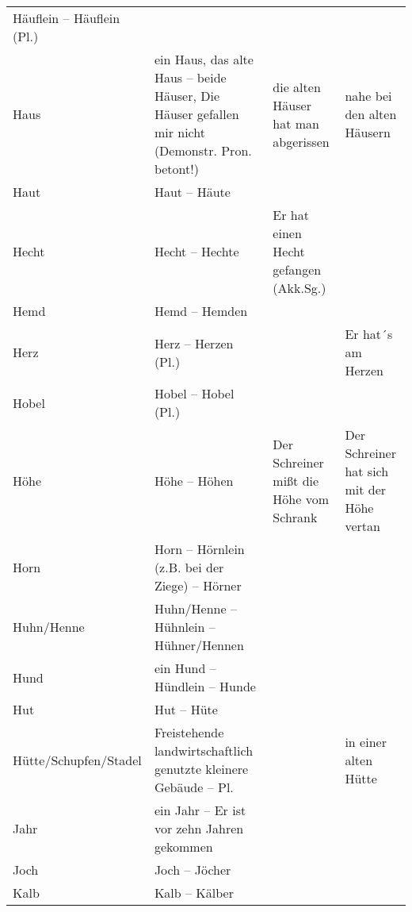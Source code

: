 {\begin{xltabular}{\textwidth}{>{\raggedright\arraybackslash}p{.15\textwidth}QQQ}
Häuflein -- Häuflein (Pl.) &  & \\
Haus & ein Haus, das alte Haus -- beide Häuser, Die Häuser gefallen mir nicht (Demonstr. Pron. betont!) & die alten Häuser hat man abgerissen & nahe bei den alten Häusern\\
Haut & Haut -- Häute &  & \\
Hecht & Hecht -- Hechte & Er hat einen Hecht gefangen (Akk.Sg.) & \\
Hemd & Hemd -- Hemden &  & \\
Herz & Herz -- Herzen (Pl.) &  & Er hat´s am Herzen\\
Hobel & Hobel -- Hobel (Pl.) &  & \\
Höhe & Höhe -- Höhen & Der Schreiner mißt die Höhe vom Schrank & Der Schreiner hat sich mit der Höhe vertan\\
Horn & Horn -- Hörnlein (z.B. bei der Ziege) -- Hörner &  & \\
Huhn\slash Henne & Huhn\slash Henne -- Hühnlein -- Hühner\slash Hennen &  & \\
Hund & ein Hund -- Hündlein -- Hunde &  & \\
Hut & Hut -- Hüte &  & \\
Hütte\slash Schupfen\slash Stadel & Freistehende landwirtschaftlich genutzte kleinere Gebäude -- Pl. &  & in einer alten Hütte\\
Jahr & ein Jahr -- Er ist vor zehn Jahren gekommen &  & \\
Joch & Joch -- Jöcher &  & \\
Kalb & Kalb -- Kälber


\end{xltabular}}
